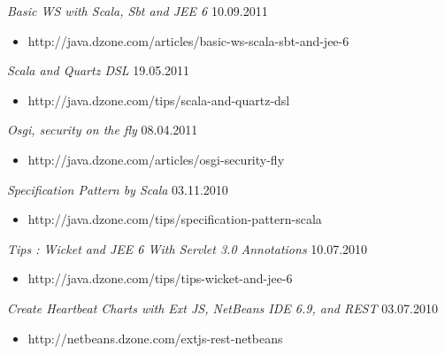 \documentclass{res}
\begin{document}
\begin{resume}
{\sl Basic WS with Scala, Sbt and JEE 6}  \hfill   10.09.2011	\\
\vspace{-5mm}  \begin{itemize}
\item[]  \scriptsize http://java.dzone.com/articles/basic-ws-scala-sbt-and-jee-6
\end{itemize}
\vspace{-2mm}

{\sl Scala and Quartz DSL}  \hfill   19.05.2011	\\
\vspace{-5mm}  \begin{itemize}
\item[]  \scriptsize http://java.dzone.com/tips/scala-and-quartz-dsl
\end{itemize}
\vspace{-2mm}

{\sl Osgi, security on the fly}  \hfill    08.04.2011	\\
\vspace{-5mm}  \begin{itemize}
\item[]  \scriptsize http://java.dzone.com/articles/osgi-security-fly
\end{itemize}
\vspace{-2mm}

{\sl Specification Pattern by Scala}  \hfill   03.11.2010	\\
\vspace{-5mm}  \begin{itemize}
\item[]  \scriptsize http://java.dzone.com/tips/specification-pattern-scala
\end{itemize}
\vspace{-2mm}

{\sl Tips : Wicket and JEE 6 With Servlet 3.0 Annotations}  \hfill  10.07.2010	\\
\vspace{-5mm}  \begin{itemize}
\item[]  \scriptsize http://java.dzone.com/tips/tips-wicket-and-jee-6
\end{itemize}
\vspace{-2mm}

{\sl Create Heartbeat Charts with Ext JS, NetBeans IDE 6.9, and REST}  \hfill    03.07.2010	\\
\vspace{-5mm}  \begin{itemize}
\item[]  \scriptsize http://netbeans.dzone.com/extjs-rest-netbeans
\end{itemize}
\vspace{-2mm}


\end{resume}
\end{document}
